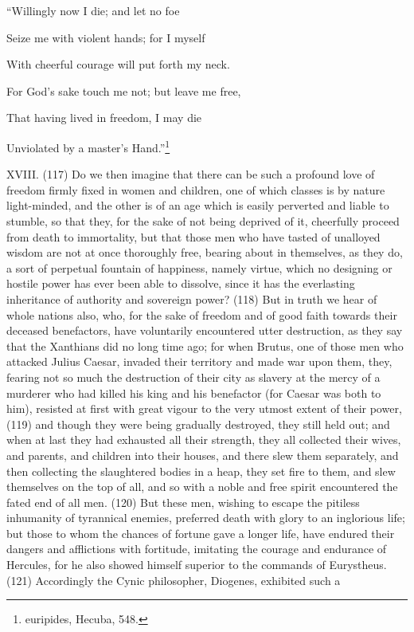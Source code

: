 ``Willingly now I die; and let no foe

Seize me with violent hands; for I myself

With cheerful courage will put forth my neck.

For God's sake touch me not; but leave me free,

That having lived in freedom, I may die

Unviolated by a master's Hand.''\footnote{euripides, Hecuba, 548.}

XVIII. (117) Do we then imagine that there can be such a profound love of freedom firmly fixed in
women and children, one of which classes is by nature light-minded, and the other is of an age
which is easily perverted and liable to stumble, so that they, for the sake of not being deprived of it,
cheerfully proceed from death to immortality, but that those men who have tasted of unalloyed
wisdom are not at once thoroughly free, bearing about in themselves, as they do, a sort of
perpetual fountain of happiness, namely virtue, which no designing or hostile power has ever been
able to dissolve, since it has the everlasting inheritance of authority and sovereign power? (118)
But in truth we hear of whole nations also, who, for the sake of freedom and of good faith towards
their deceased benefactors, have voluntarily encountered utter destruction, as they say that the
Xanthians did no long time ago; for when Brutus, one of those men who attacked Julius Caesar,
invaded their territory and made war upon them, they, fearing not so much the destruction of their
city as slavery at the mercy of a murderer who had killed his king and his benefactor (for Caesar
was both to him), resisted at first with great vigour to the very utmost extent of their power, (119)
and though they were being gradually destroyed, they still held out; and when at last they had
exhausted all their strength, they all collected their wives, and parents, and children into their
houses, and there slew them separately, and then collecting the slaughtered bodies in a heap, they
set fire to them, and slew themselves on the top of all, and so with a noble and free spirit
encountered the fated end of all men. (120) But these men, wishing to escape the pitiless
inhumanity of tyrannical enemies, preferred death with glory to an inglorious life; but those to whom
the chances of fortune gave a longer life, have endured their dangers and afflictions with fortitude,
imitating the courage and endurance of Hercules, for he also showed himself superior to the
commands of Eurystheus. (121) Accordingly the Cynic philosopher, Diogenes, exhibited such a
